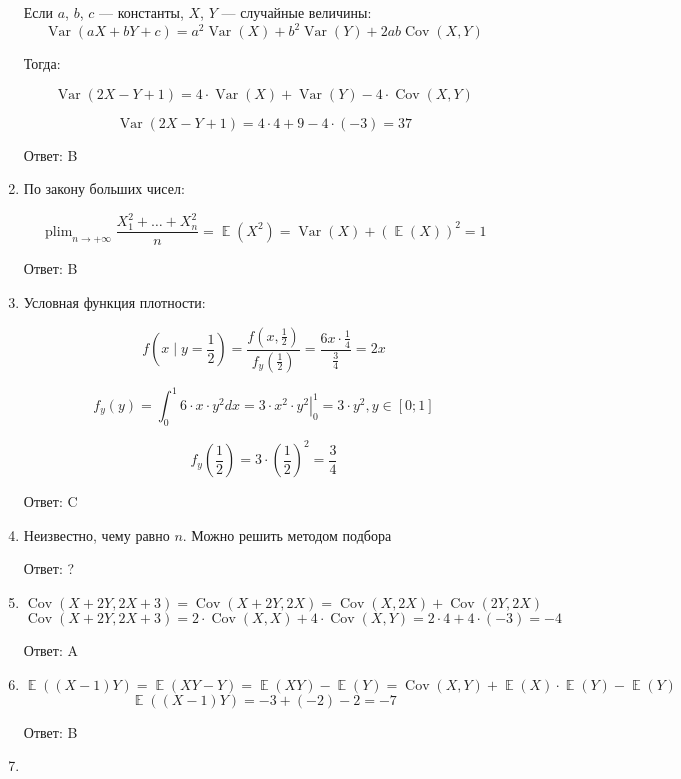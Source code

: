 \documentclass[a4paper,12pt]{article} %
\DeclareMathOperator*\plim{plim}
\DeclareMathOperator{\Var}{Var}
\DeclareMathOperator{\Cov}{Cov}
\DeclareMathOperator{\E}{\mathbb{E}}
\begin{document}
\begin{enumerate}
    Если $a$, $b$, $c$ —  константы, $X$, $Y$ — случайные величины:
    \[\Var(aX + bY + c) = a^2 \Var(X) + b^2 \Var(Y) + 2ab\Cov(X,Y)\]
    
    Тогда:

    \[\Var(2X - Y + 1) = 4\cdot \Var(X) + \Var(Y) - 4 \cdot \Cov(X,Y) \]
    
    \[\Var(2X - Y + 1) = 4 \cdot 4 + 9 - 4 \cdot (-3) = 37\]

    Ответ: B

    \item
    
    По закону больших чисел:

    \[\plim _{n\rightarrow +\infty}\frac{X_{1}^2 + \dots + X_{n}^2}{n} = \E(X^2) = \Var(X) +(\E(X))^2 = 1\]

    Ответ: B

    \item

    Условная функция плотности:

    \[f\left(x\mid y=\frac{1}{2}\right) = \frac{f\left(x,\frac{1}{2}\right)}{f_{y}\left(\frac{1}{2}\right)} = \frac{6x\cdot\frac{1}{4}}{\frac{3}{4}} = 2x\]

    \[f_{y}(y) = \int_0^1 6\cdot x\cdot y^2 dx = \left.3 \cdot x^2 \cdot y^2\right|_0^1  = 3\cdot y^2, y \in [0;1] \]
    
    \[f_{y}\left(\frac{1}{2}\right) = 3 \cdot \left(\frac{1}{2}\right)^2 = \frac{3}{4}\]

    Ответ: C

    \item

    Неизвестно, чему равно $n$. Можно решить методом подбора
    
    Ответ: ?

    \item

    \[\Cov(X+2Y, 2X + 3) = \Cov(X+2Y, 2X) = \Cov(X, 2X) + \Cov(2Y, 2X) \]
    \[\Cov(X+2Y, 2X + 3) = 2 \cdot \Cov(X,X) + 4 \cdot \Cov(X,Y) = 2 \cdot 4 + 4 \cdot (-3) = -4\]

    Ответ: A

    \item

    \[\E((X-1)Y) = \E(XY - Y) = \E(XY) - \E(Y) = \Cov(X,Y) + \E(X)\cdot\E(Y) -\E(Y)\] 
    \[\E((X-1)Y) = -3 + (-2) - 2 = -7\]

    Ответ: B

    \item
    

\end{enumerate}
\end{document}
